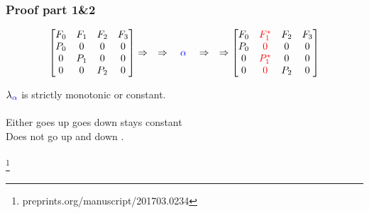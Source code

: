 \documentclass{beamer}
\newcommand\blfootnote[1]{%
  \begingroup
  \renewcommand\thefootnote{}\footnote{#1}%
  \addtocounter{footnote}{-1}%
  \endgroup
}
\begin{document}
\begin{frame}
\frametitle{Proof part 1\&2}


\begin{equation*}
\begin{bmatrix}
    F_0 & F_1 & F_2 & F_3  \\
    P_0 &  0  &  0  &  0   \\
     0  & P_1 &  0  &  0   \\
     0  &  0  & P_2 &  0 
\end{bmatrix}
\Rightarrow\quad \Rightarrow\quad\textcolor{blue}{\alpha}\quad \Rightarrow\quad \Rightarrow
\begin{bmatrix}
    F_0 & \textcolor{red}{F^*_1} & F_2 & F_3  \\
    P_0 & \textcolor{red}{0}  &  0  &  0   \\
     0  & \textcolor{red}{P^*_1} &  0  &  0   \\
     0  & \textcolor{red}{0}  & P_2 &  0 
\end{bmatrix}
\end{equation*}

$\lambda_{\textcolor{blue}{\alpha}}$ is strictly monotonic or constant.\\\-\\
Either goes up \nearrow goes down \searrow stays constant \rightarrow\\
Does not go up and down \rightsquigarrow.\\\-\\


\blfootnote{%
preprints.org/manuscript/201703.0234
}
\end{frame}
\end{document}
